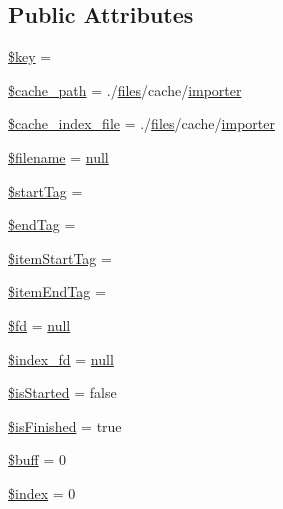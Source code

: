 \subsection*{Public Attributes}
\begin{DoxyCompactItemize}
\item 
\hyperlink{classextract_a894aac7e47b9ed0773922aa7eb9ce578}{\$key} = \textquotesingle{}\textquotesingle{}
\item 
\hyperlink{classextract_a00f1309c1e975d137a9f17ad9afc5d1e}{\$cache\+\_\+path} = \textquotesingle{}./\hyperlink{popup_8min_8js_a0742cac2750bccc2d88ac080fb9daa22}{files}/cache/\hyperlink{classimporter}{importer}\textquotesingle{}
\item 
\hyperlink{classextract_a6bd40f89eeb4e608723a39f5824d0c1e}{\$cache\+\_\+index\+\_\+file} = \textquotesingle{}./\hyperlink{popup_8min_8js_a0742cac2750bccc2d88ac080fb9daa22}{files}/cache/\hyperlink{classimporter}{importer}\textquotesingle{}
\item 
\hyperlink{classextract_abec232df6889e57dd327ddf132799f4c}{\$filename} = \hyperlink{modernizr_8min_8js_a286f9ec831c5e676eeb493248eab9575}{null}
\item 
\hyperlink{classextract_a3acbe3af3d1b083b33023202a5e05432}{\$start\+Tag} = \textquotesingle{}\textquotesingle{}
\item 
\hyperlink{classextract_a46190b1f23addca9726e18aa15929c2a}{\$end\+Tag} = \textquotesingle{}\textquotesingle{}
\item 
\hyperlink{classextract_a11629128aedd1fc4b0a889640c693d0a}{\$item\+Start\+Tag} = \textquotesingle{}\textquotesingle{}
\item 
\hyperlink{classextract_abddb079afc9c7c2f210e7793b93388e5}{\$item\+End\+Tag} = \textquotesingle{}\textquotesingle{}
\item 
\hyperlink{classextract_ae21a224916b245a23dd69139f58c81ed}{\$fd} = \hyperlink{modernizr_8min_8js_a286f9ec831c5e676eeb493248eab9575}{null}
\item 
\hyperlink{classextract_a6805ee81f498cae226d90b8fa9ecba88}{\$index\+\_\+fd} = \hyperlink{modernizr_8min_8js_a286f9ec831c5e676eeb493248eab9575}{null}
\item 
\hyperlink{classextract_a609fc88642ae3bf1e27f0232f1b21171}{\$is\+Started} = false
\item 
\hyperlink{classextract_a0962c888279f7c5d551d3fdf1af1ee4c}{\$is\+Finished} = true
\item 
\hyperlink{classextract_a6f9b9ca9e370fe234587851838a368e7}{\$buff} = 0
\item 
\hyperlink{classextract_a167ca671b16d1b95eef76886f6d91a0c}{\$index} = 0
\end{DoxyCompactItemize}


